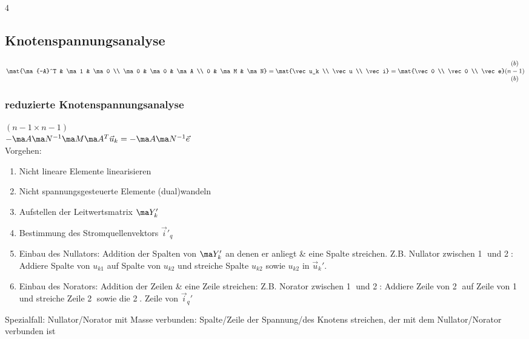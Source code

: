 \documentclass[fs, footer]{latex4ei}
\begin{document}
\begin{multicols*}{4}
    \subsection{Knotenspannungsanalyse}
    $\mat{\ma{-A}^T & \ma 1 & \ma 0 \\ \ma 0 & \ma 0 & \ma A \\ 0 & \ma M & \ma N}=\mat{\vec u_k \\ \vec u \\ \vec i}=\mat{\vec 0 \\ \vec 0 \\ \vec e} \begin{matrix}(b) \\ (n-1) \\ (b)\end{matrix}$

    \subsubsection{reduzierte Knotenspannungsanalyse}
     $(n-1 \times n-1)$\\
    $- \ma A \ma N^{-1} \ma M \ma A^T \vec u_k=-\ma A \ma N^{-1} \vec e$\\
    Vorgehen:
    \begin{enumerate}\itemsep0pt
        \item Nicht lineare Elemente linearisieren
        \item Nicht spannungsgesteuerte Elemente (dual)wandeln
        \item Aufstellen der Leitwertsmatrix $\ma Y'_k$
        \item Bestimmung des Stromquellenvektors $\vec i'_q$
        \item Einbau des Nullators: Addition der Spalten von $\ma Y'_k$ an denen er anliegt \& eine Spalte streichen. Z.B. Nullator zwischen \textcircled{1} und \textcircled{2}: Addiere Spalte von $u_{k1}$ auf Spalte von $u_{k2}$ und streiche Spalte $u_{k2}$ sowie $u_{k2}$ in $\vec u_k'$.
        \item Einbau des Norators: Addition der Zeilen \& eine Zeile streichen: Z.B. Norator zwischen \textcircled{1} und \textcircled{2}: Addiere Zeile von \textcircled{2} auf Zeile von \textcircled{1} und streiche Zeile \textcircled{2} sowie die \textcircled{2}. Zeile von $\vec i_q'$

    \end{enumerate}
    Spezialfall: Nullator/Norator mit Masse verbunden: Spalte/Zeile der Spannung/des Knotens streichen, der mit dem Nullator/Norator verbunden ist

\end{multicols*}
\end{document}
